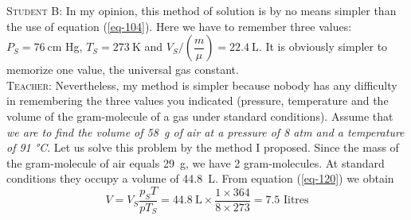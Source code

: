 \documentclass[a4paper,sfsidenotes]{tufte-book}
\begin{document}
\textsc{Student B:} In my opinion, this method of solution is by no means simpler than the use of equation (\ref{eq-104}). Here we have to remember three values: $P_{S}=\SI{76}{\centi\meter}$ Hg, $T_{S}=\SI{273}{\kelvin}$ and $V_{S}/\left( \dfrac{m}{\mu} \right) =\SI{22.4}{\liter}$. It is obviously simpler to memorize
one value, the universal gas constant.
\\
\textsc{Teacher:} Nevertheless, my method is simpler because nobody has any difficulty in remembering the three values you indicated (pressure, temperature and the volume of the gram-molecule of a gas under standard conditions). Assume that \emph{we are to find the volume of \SI{58}{\gram} of air at a pressure of 8 atm and a temperature of 91 \si{\degreeCelsius}}. Let us solve this problem by the method I proposed. Since the mass of the gram-molecule of air equals \SI{29}{\gram}, we have 2 gram-molecules. At standard conditions they occupy a volume of \SI{44.8}{\liter}. From equation (\ref{eq-120}) we obtain
\begin{equation*}%
V = V_{S} \frac{p_{S}T}{p T_{S}} = \SI{44.8}{\liter} \times \frac{1 \times 364}{ 8 \times 273} = 7.5 \,\,\text{Iitres}
\end{equation*}
\end{document}
